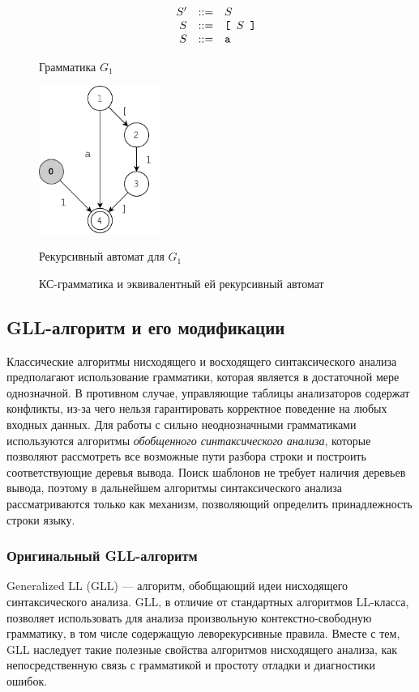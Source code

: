 \begin{figure}[h]
	\centering
		$$
		\begin{array}{crcl}
		&S' & ::= & S \\
		&S  & ::= & \texttt{[ } S \texttt{ ]}\\
		&S  & ::= & \mbox{\texttt{a}}
		\end{array}
		$$
		\caption{Грамматика $G_1$}
\end{figure}
\begin{figure}[h]
	\centering
		\centering
		\includegraphics[width=4cm]{Kovalev/pictures/ra_example.pdf}
		\caption{Рекурсивный автомат для $G_1$}
	\caption{КС-грамматика и эквивалентный ей рекурсивный автомат}
	\label{fig:ra_ex}
\end{figure}

\subsection{GLL-алгоритм и его модификации}

Классические алгоритмы нисходящего и восходящего синтаксического анализа предполагают использование грамматики, которая является в достаточной мере однозначной. 
В противном случае, управляющие таблицы анализаторов содержат конфликты, из-за чего нельзя гарантировать корректное поведение на любых входных данных. 
Для работы с сильно неоднозначными грамматиками используются алгоритмы \textit{обобщенного синтаксического анализа}, которые позволяют рассмотреть все возможные пути разбора строки и построить соответствующие деревья вывода.
Поиск шаблонов не требует наличия деревьев вывода, поэтому в дальнейшем алгоритмы синтаксического анализа рассматриваются только как механизм, позволяющий определить принадлежность строки языку.

\subsubsection{Оригинальный GLL-алгоритм}

Generalized LL (GLL) --- алгоритм, обобщающий идеи нисходящего синтаксического анализа. GLL, в отличие от стандартных алгоритмов LL-класса, позволяет использовать для анализа произвольную контекстно-свободную грамматику, в том числе содержащую леворекурсивные правила. Вместе с тем, GLL наследует такие полезные свойства алгоритмов нисходящего анализа, как непосредственную связь с грамматикой и простоту отладки и диагностики ошибок.

